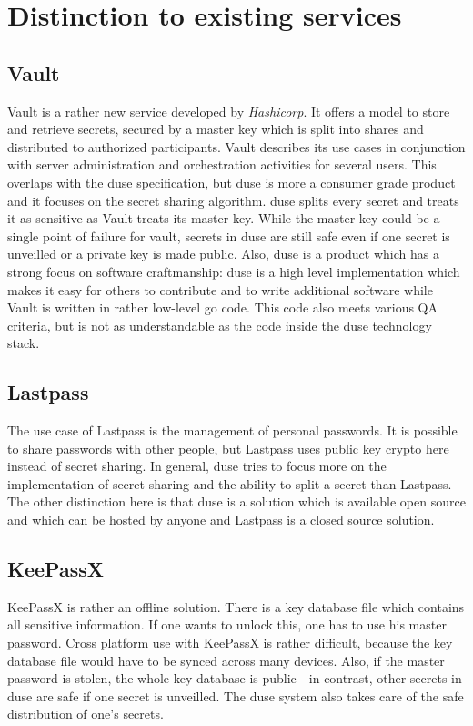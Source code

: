 \chapter{Distinction to existing services}

\section{Vault}

Vault is a rather new service developed by \textit{Hashicorp}.
It offers a model to store and retrieve secrets, secured by a
master key which is split into shares and distributed to authorized
participants. Vault describes its use cases in conjunction with
server administration and orchestration activities for several users.
This overlaps with the duse specification, but duse is more a
consumer grade product and it focuses on the secret sharing algorithm.
duse splits every secret and treats it
as sensitive as Vault treats its master key. While the master key
could be a single point of failure for vault, secrets in duse
are still safe even if one secret is unveilled or a private key
is made public. Also, duse is a product which has a strong focus
on software craftmanship: duse is a high level implementation which
makes it easy for others to contribute and to write additional
software while Vault is written in rather low-level go code. This
code also meets various QA criteria, but is not as understandable
as the code inside the duse technology stack.

\section{Lastpass}

The use case of Lastpass is the management of personal passwords.
It is possible to share passwords with other people, but Lastpass
uses public key crypto here instead of secret sharing. In general,
duse tries to focus more on the implementation of secret sharing
and the ability to split a secret than Lastpass. The other distinction
here is that duse is a solution which is available open source and
which can be hosted by anyone and Lastpass is a closed source
solution.

\section{KeePassX}

KeePassX is rather an offline solution. There is a key database file
which contains all sensitive information. If one wants to unlock this,
one has to use his master password. Cross platform use with KeePassX is rather
difficult, because the key database file would have to be synced
across many devices. Also, if the master password is stolen, the whole
key database is public - in contrast, other secrets in duse are safe if
one secret is unveilled. The duse system also takes care of the safe
distribution of one's secrets.

